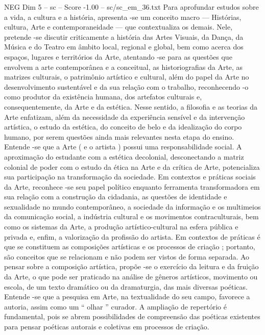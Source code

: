 \begin{textsample}{NEG Dim 5 – sc – Score -1.00 – sc/sc\_em\_36.txt}  \label{ex:f5_neg_255}
Para aprofundar estudos sobre a vida, a cultura e a história, apresenta -se um conceito macro — Histórias, cultura, Arte e contemporaneidade — que contextualiza os demais.
Nele, pretende -se discutir criticamente a história das Artes Visuais, da Dança, da Música e do Teatro em âmbito local, regional e global, bem como acerca dos espaços, lugares e territórios da Arte, atentando -se para as questões que envolvem a arte contemporânea e a conceitual, as historiografias da Arte, as matrizes culturais, o patrimônio artístico e cultural, além do papel da Arte no desenvolvimento sustentável e da sua relação com o trabalho, reconhecendo -o como produtor da existência humana, dos artefatos culturais e, consequentemente, da Arte e da estética.
Nesse sentido, a filosofia e as teorias da Arte enfatizam, além da necessidade da experiência sensível e da intervenção artística, o estudo da estética, do conceito de belo e da idealização do corpo humano, por serem questões ainda mais relevantes nesta etapa do ensino.
Entende -se que a Arte ( e o artista ) possui uma responsabilidade social.
A aproximação do estudante com a estética decolonial, desconectando a matriz colonial de poder com o estudo da ética na Arte e da crítica de Arte, potencializa sua participação na transformação da sociedade.
Em contextos e práticas sociais da Arte, reconhece -se seu papel político enquanto ferramenta transformadora em sua relação com a construção da cidadania, as questões de identidade e sexualidade no mundo contemporâneo, a sociedade da informação e os multimeios da comunicação social, a indústria cultural e os movimentos contraculturais, bem como os sistemas da Arte, a produção artístico-cultural na esfera pública e privada e, enfim, a valorização da profissão do artista.
Em contextos de práticas é que se constituem as composições artísticas e os processos de criação ; portanto, são conceitos que se relacionam e não podem ser vistos de forma separada.
Ao pensar sobre a composição artística, propõe -se o exercício da leitura e da fruição da Arte, o que pode ser praticado na análise de gêneros artísticos, movimento ou escola, de um texto dramático ou da dramaturgia, das mais diversas poéticas.
Entende -se que a pesquisa em Arte, na textualidade do seu campo, favorece a autoria, assim como um “ olhar ” curador.
A ampliação de repertório é fundamental, pois se abrem possibilidades de compreensão das poéticas existentes para pensar poéticas autorais e coletivas em processos de criação.

\end{textsample}
